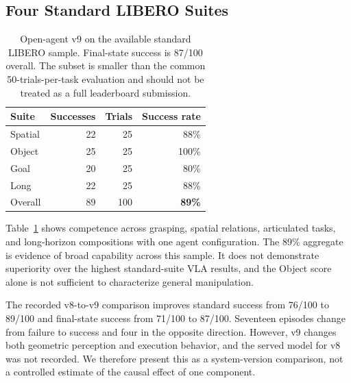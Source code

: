 \subsection{Four Standard LIBERO Suites}
\begin{table}[t]
\centering
\begin{tabular}{@{}lrrr@{}}
\toprule
Suite & Successes & Trials & Success rate \\
\midrule
Spatial & 22 & 25 & 88\% \\
Object & 25 & 25 & 100\% \\
Goal & 20 & 25 & 80\% \\
Long & 22 & 25 & 88\% \\
\midrule
Overall & 89 & 100 & \textbf{89\%} \\
\bottomrule
\end{tabular}
\caption{Open-agent v9 on the available standard LIBERO sample. Final-state success is 87/100 overall. The subset is smaller than the common 50-trials-per-task evaluation and should not be treated as a full leaderboard submission.}
\label{tab:libero}
\end{table}

Table~\ref{tab:libero} shows competence across grasping, spatial relations, articulated tasks, and long-horizon compositions with one agent configuration. The 89\% aggregate is evidence of broad capability across this sample. It does not demonstrate superiority over the highest standard-suite VLA results, and the Object score alone is not sufficient to characterize general manipulation.

The recorded v8-to-v9 comparison improves standard success from 76/100 to 89/100 and final-state success from 71/100 to 87/100. Seventeen episodes change from failure to success and four in the opposite direction. However, v9 changes both geometric perception and execution behavior, and the served model for v8 was not recorded. We therefore present this as a system-version comparison, not a controlled estimate of the causal effect of one component.

